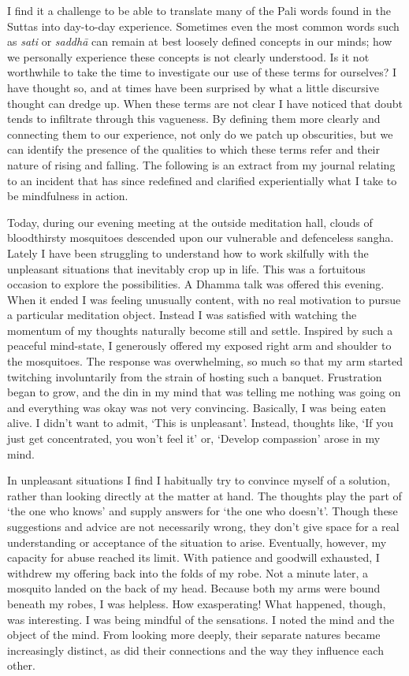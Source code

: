 
I find it a challenge to be able to translate many of the Pali words
found in the Suttas into day-to-day experience. Sometimes even the most
common words such as \emph{sati} or \emph{saddhā} can remain at best
loosely defined concepts in our minds; how we personally experience
these concepts is not clearly understood. Is it not worthwhile to take
the time to investigate our use of these terms for ourselves? I have
thought so, and at times have been surprised by what a little discursive
thought can dredge up. When these terms are not clear I have noticed
that doubt tends to infiltrate through this vagueness. By defining them
more clearly and connecting them to our experience, not only do we patch
up obscurities, but we can identify the presence of the qualities to
which these terms refer and their nature of rising and falling. The
following is an extract from my journal relating to an incident that has
since redefined and clarified experientially what I take to be
mindfulness in action. 

Today, during our evening meeting at the outside meditation hall, clouds
of bloodthirsty mosquitoes descended upon our vulnerable and defenceless
sangha. Lately I have been struggling to understand how to work
skilfully with the unpleasant situations that inevitably crop up in
life. This was a fortuitous occasion to explore the possibilities. A
Dhamma talk was offered this evening. When it ended I was feeling
unusually content, with no real motivation to pursue a particular
meditation object. Instead I was satisfied with watching the momentum of
my thoughts naturally become still and settle. Inspired by such a
peaceful mind-state, I generously offered my exposed right arm and
shoulder to the mosquitoes. The response was overwhelming, so much so
that my arm started twitching involuntarily from the strain of hosting
such a banquet. Frustration began to grow, and the din in my mind that
was telling me nothing was going on and everything was okay was not very
convincing. Basically, I was being eaten alive. I didn't want to admit, 
`This is unpleasant'. Instead, thoughts like, `If you just get
concentrated, you won't feel it' or, `Develop compassion' arose in my
mind. 

In unpleasant situations I find I habitually try to convince myself of a
solution, rather than looking directly at the matter at hand. The
thoughts play the part of `the one who knows' and supply answers for
`the one who doesn't'. Though these suggestions and advice are not
necessarily wrong, they don't give space for a real understanding or
acceptance of the situation to arise. Eventually, however, my capacity
for abuse reached its limit. With patience and goodwill exhausted, I
withdrew my offering back into the folds of my robe. Not a minute later, 
a mosquito landed on the back of my head. Because both my arms were
bound beneath my robes, I was helpless. How exasperating! What happened, 
though, was interesting. I was being mindful of the sensations. I noted
the mind and the object of the mind. From looking more deeply, their
separate natures became increasingly distinct, as did their connections
and the way they influence each other. 

